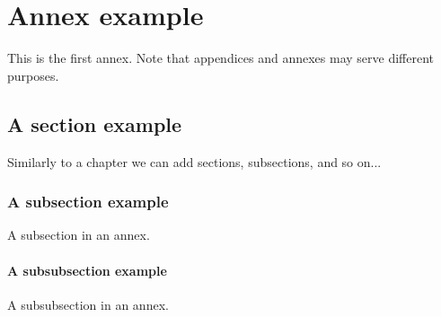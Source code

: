 \chapter{Annex example}
\label{an1}

This is the first annex.
Note that appendices and annexes may serve different purposes.


\section{A section example}
\label{an1:s:a-section-example}

Similarly to a chapter we can add sections, subsections, and so on...


\subsection{A subsection example}
\label{an1:ss:a-subsection-example}

A subsection in an annex.


\subsubsection{A subsubsection example}
\label{an1:sss:a-subsubsection-example}

A subsubsection in an annex.
